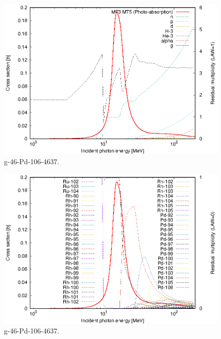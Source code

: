 \begin{figure}
 \includegraphics[width=\linewidth]{eps/g_46-Pd-106_4637.eps}
  \caption{g-46-Pd-106-4637.}
\end{figure}
\begin{figure}
 \includegraphics[width=\linewidth]{eps-law0/g_46-Pd-106_4637.eps}
 \caption{g-46-Pd-106-4637.}
\end{figure}
\newpage \clearpage

